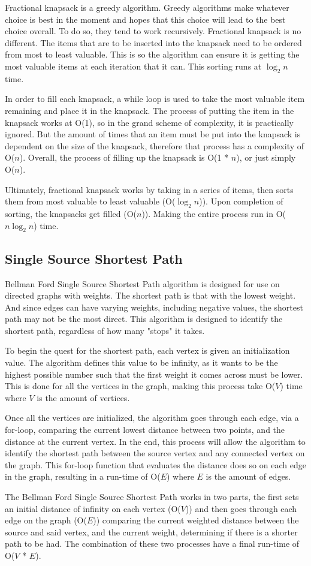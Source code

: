\documentclass[letterpaper, 10pt,DIV=13]{scrartcl}
\numberwithin{equation}{section} %
\numberwithin{figure}{section} %
\numberwithin{table}{section} %
\begin{document}
Fractional knapsack is a greedy algorithm.  Greedy algorithms make whatever choice is best in the moment and hopes that this choice will lead to the best choice overall.  To do so, they tend to work recursively.  Fractional knapsack is no different.  The items that are to be inserted into the knapsack need to be ordered from most to least valuable.  This is so the algorithm can ensure it is getting the most valuable items at each iteration that it can.  This sorting runs at $\log_2 n$ time.

In order to fill each knapsack, a while loop is used to take the most valuable item remaining and place it in the knapsack.  The process of putting the item in the knapsack works at O(1), so in the grand scheme of complexity, it is practically ignored.  But the amount of times that an item must be put into the knapsack is dependent on the size of the knapsack, therefore that process has a complexity of O($n$).  Overall, the process of filling up the knapsack is O(1 * $n$), or just simply O($n$).

Ultimately, fractional knapsack works by taking in a series of items, then sorts them from most valuable to least valuable (O($\log_2 n$)).  Upon completion of sorting, the knapsacks get filled (O($n$)).  Making the entire process run in O($n \log_2 n$) time. 

\subsection{Single Source Shortest Path}

Bellman Ford Single Source Shortest Path algorithm is designed for use on directed graphs with weights.  The shortest path is that with the lowest weight.  And since edges can have varying weights, including negative values, the shortest path may not be the most direct.  This algorithm is designed to identify the shortest path, regardless of how many "stops" it takes.  

To begin the quest for the shortest path, each vertex is given an initialization value.  The algorithm defines this value to be infinity, as it wants to be the highest possible number such that the first weight it comes across must be lower.  This is done for all the vertices in the graph, making this process take O($V$) time where $V$ is the amount of vertices.

Once all the vertices are initialized, the algorithm goes through each edge, via a for-loop, comparing the current lowest distance between two points, and the distance at the current vertex.  In the end, this process will allow the algorithm to identify the shortest path between the source vertex and any connected vertex on the graph.  This for-loop function that evaluates the distance does so on each edge in the graph, resulting in a run-time of O($E$) where $E$ is the amount of edges.

The Bellman Ford Single Source Shortest Path works in two parts, the first sets an initial distance of infinity on each vertex (O($V$)) and then goes through each edge on the graph (O($E$)) comparing the current weighted distance between the source and said vertex, and the current weight, determining if there is a shorter path to be had.  The combination of these two processes have a final run-time of O($V$ * $E$).
\end{document}
